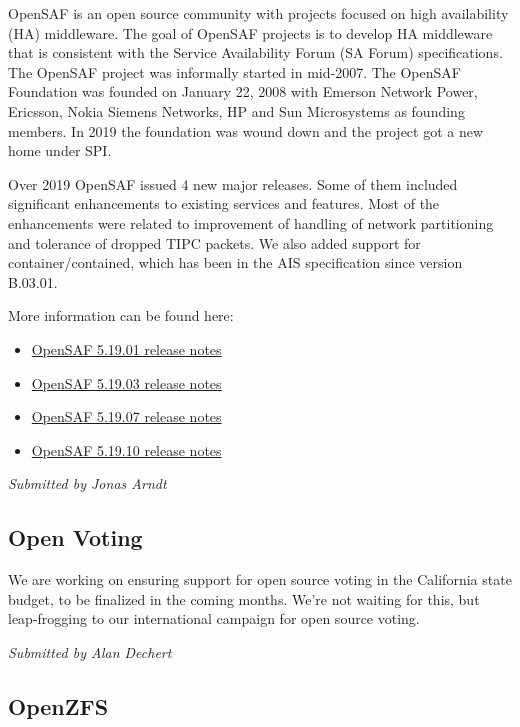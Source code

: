\documentclass[a4paper]{report}
\begin{document}
OpenSAF is an open source community with projects focused on high
availability (HA) middleware.  The goal of OpenSAF projects is to
develop HA middleware that is consistent with the Service Availability
Forum (SA Forum) specifications.  The OpenSAF project was informally
started in mid-2007.  The OpenSAF Foundation was founded on January 22,
2008 with Emerson Network Power, Ericsson, Nokia Siemens Networks, HP
and Sun Microsystems as founding members.  In 2019 the foundation was
wound down and the project got a new home under SPI.

Over 2019 OpenSAF issued 4 new major releases.  Some of them included
significant enhancements to existing services and features.  Most of the
enhancements were related to improvement of handling of network
partitioning and tolerance of dropped TIPC packets. We also added
support for container/contained, which has been in the AIS specification
since version B.03.01.

More information can be found here:

\begin{itemize}

\item \href{https://sourceforge.net/p/opensaf/wiki/NEWS-5.19.01/}{OpenSAF 5.19.01 release notes}
\item \href{https://sourceforge.net/p/opensaf/wiki/NEWS-5.19.03/}{OpenSAF 5.19.03 release notes}
\item \href{https://sourceforge.net/p/opensaf/wiki/NEWS-5.19.07/}{OpenSAF 5.19.07 release notes}
\item \href{https://sourceforge.net/p/opensaf/wiki/NEWS-5.19.10/}{OpenSAF 5.19.10 release notes}

\end{itemize}

{\em Submitted by Jonas Arndt}

\subsection{Open Voting}

We are working on ensuring support for open source voting in the
California state budget, to be finalized in the coming months.  We're
not waiting for this, but leap-frogging to our international campaign
for open source voting.

{\em Submitted by Alan Dechert}

\subsection{OpenZFS}
\end{document}
